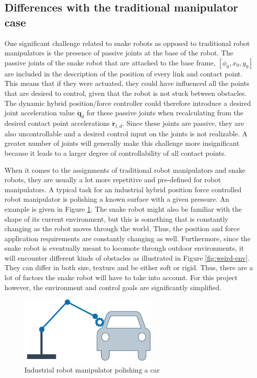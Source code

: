 \subsection{Differences with the traditional manipulator case}

One significant challenge related to snake robots as opposed to traditional robot manipulators is the presence of passive joints at the base of the robot. The passive joints of the snake robot that are attached to the base frame, $[\phi_0, x_0, y_0]$ are included in the description of the position of every link and contact point. This means that if they were actuated, they could have influenced all the points that are desired to control, given that the robot is not stuck between obstacles. The dynamic hybrid position/force controller could therefore introduce a desired joint acceleration value $\ddot{\mathbf{q}}_d$ for these passive joints when recalculating from the desired contact point accelerations $\ddot{\mathbf{r}}_{t,d}$. Since these joints are passive, they are also uncontrollable and a desired control input on the joints is not realizable. A greater number of joints will generally make this challenge more insignificant because it leads to a larger degree of controllability of all contact points.

When it comes to the assignments of traditional robot manipulators and snake robots, they are usually a lot more repetitive and pre-defined for robot manipulators. A typical task for an industrial hybrid position force controlled robot manipulator is polishing a known surface with a given pressure. An example is given in Figure \ref{fig:robotman-polish}. The snake robot might also be familiar with the shape of its current environment, but this is something that is constantly changing as the robot moves through the world. Thus, the position and force application requirements are constantly changing as well. Furthermore, since the snake robot is eventually meant to locomote through outdoor environments, it will encounter different kinds of obstacles as illustrated in Figure \ref{fig:weird-env}. They can differ in both size, texture and be either soft or rigid. Thus, there are a lot of factors the snake robot will have to take into account. For this project however, the environment and control goals are significantly simplified.

\begin{figure}
    \centering
    \includegraphics[width=0.6\textwidth]{figures/theory/robotman-polish.pdf}
    \caption{Industrial robot manipulator polishing a car}
    \label{fig:robotman-polish}
\end{figure}

